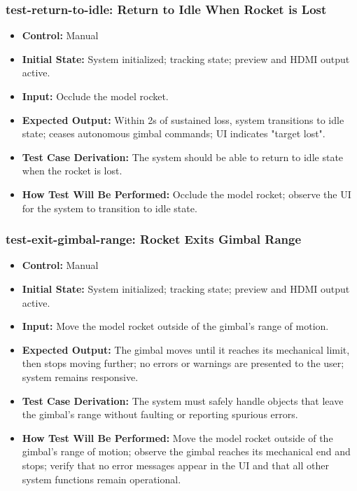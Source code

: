 \documentclass[12pt, titlepage]{article}
\begin{document}
\subsubsection*{test-return-to-idle: Return to Idle When Rocket is Lost}
\begin{itemize}
  \item \textbf{Control:} Manual
  \item \textbf{Initial State:} System initialized; tracking state; preview and HDMI output active.
  \item \textbf{Input:} Occlude the model rocket.
  \item \textbf{Expected Output:} Within 2s of sustained loss, system transitions to idle state; ceases autonomous gimbal commands; UI indicates "target lost".
  \item \textbf{Test Case Derivation:} The system should be able to return to idle state when the rocket is lost.
  \item \textbf{How Test Will Be Performed:} Occlude the model rocket; observe the UI for the system to transition to idle state.
\end{itemize}

\subsubsection*{test-exit-gimbal-range: Rocket Exits Gimbal Range}
\begin{itemize}
  \item \textbf{Control:} Manual
  \item \textbf{Initial State:} System initialized; tracking state; preview and HDMI output active.
  \item \textbf{Input:} Move the model rocket outside of the gimbal's range of motion.
  \item \textbf{Expected Output:} The gimbal moves until it reaches its mechanical limit, then stops moving further; no errors or warnings are presented to the user; system remains responsive.
  \item \textbf{Test Case Derivation:} The system must safely handle objects that leave the gimbal's range without faulting or reporting spurious errors.
  \item \textbf{How Test Will Be Performed:} Move the model rocket outside of the gimbal's range of motion; observe the gimbal reaches its mechanical end and stops; verify that no error messages appear in the UI and that all other system functions remain operational.
\end{itemize}
\end{document}
